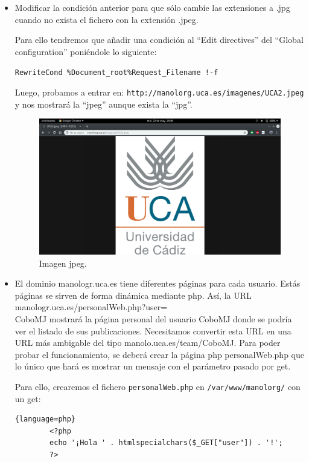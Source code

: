 \documentclass[12pt,letterpaper]{article}
\begin{document}
\begin{itemize}
	\item Modificar la condición anterior para que sólo cambie las extensiones a .jpg cuando no exista el fichero con la extensión .jpeg.

	Para ello tendremos que añadir una condición al ``Edit directives'' del ``Global configuration'' poniéndole lo siguiente:
	\begin{center}
		\texttt{RewriteCond \%{Document\_root}\%{Request\_Filename} !-f}
	\end{center}
	
	Luego, probamos a entrar en: \texttt{http://manolorg.uca.es/imagenes/UCA2.jpeg} y nos mostrará la ``jpeg'' aunque exista la ``jpg''.
	\newpage
	\begin{figure}[h]
		\centering
		\includegraphics[scale=0.34]{Imagen2.png}
		\caption{Imagen jpeg.}
		\label{Imagen jpeg}
	\end{figure}
	
	\item El dominio manologr.uca.es tiene diferentes páginas para cada usuario. Estás páginas se sirven de forma dinámica mediante php. Así, la URL manologr.uca.es/personalWeb.php?user=\\CoboMJ mostrará la página personal del usuario CoboMJ donde se podría ver el listado de sus	publicaciones. Necesitamos convertir esta URL en una URL más ambigable del tipo manolo.uca.es/team/CoboMJ. Para poder probar el funcionamiento, se deberá crear la página php personalWeb.php que lo único que hará es mostrar un mensaje con el parámetro pasado por get.
	
	Para ello, crearemos el fichero \texttt{personalWeb.php} en \texttt{/var/www/manolorg/} con un get:
	\begin{lstlisting}{language=php}
		<?php
		echo '¡Hola ' . htmlspecialchars($_GET["user"]) . '!';
		?>
	\end{lstlisting}
	

\end{itemize}
\end{document}
